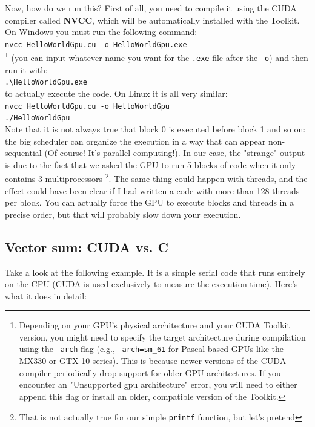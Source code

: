 Now, how do we run this? First of all, you need to compile it using the CUDA compiler called \textbf{NVCC}, which will be automatically installed with the Toolkit. On Windows you must run the following command:\\
\texttt{nvcc HelloWorldGpu.cu -o HelloWorldGpu.exe} \\
\footnote{Depending on your GPU's physical architecture and your CUDA Toolkit version, you might need to specify the target architecture during compilation using the \texttt{-arch} flag (e.g., \texttt{-arch=sm\_61} for Pascal-based GPUs like the MX330 or GTX 10-series). This is because newer versions of the CUDA compiler periodically drop support for older GPU architectures. If you encounter an "Unsupported gpu architecture" error, you will need to either append this flag or install an older, compatible version of the Toolkit.} 
(you can input whatever name you want for the \texttt{.exe} file after the \texttt{-o}) and then run it with:\\
\texttt{.\textbackslash HelloWorldGpu.exe}\\
to actually execute the code. On Linux it is all very similar: \\
\texttt{nvcc HelloWorldGpu.cu -o HelloWorldGpu}\\
\texttt{./HelloWorldGpu}\\
Note that it is not always true that block 0 is executed before block 1 and so on: the big scheduler can organize the execution in a way that can appear non-sequential (Of course! It's parallel computing!). In our case, the "strange" output is due to the fact that we asked the GPU to run 5 blocks of code when it only contains 3 multiprocessors \footnote{That is not actually true for our simple \texttt{printf} function, but let's pretend}. The same thing could happen with threads, and the effect could have been clear if I had written a code with more than 128 threads per block. You can actually force the GPU to execute blocks and threads in a precise order, but that will probably slow down your execution. 

\subsection{Vector sum: CUDA vs. C}
Take a look at the following example. It is a simple serial code that runs entirely on the CPU (CUDA is used exclusively to measure the execution time). Here's what it does in detail:

